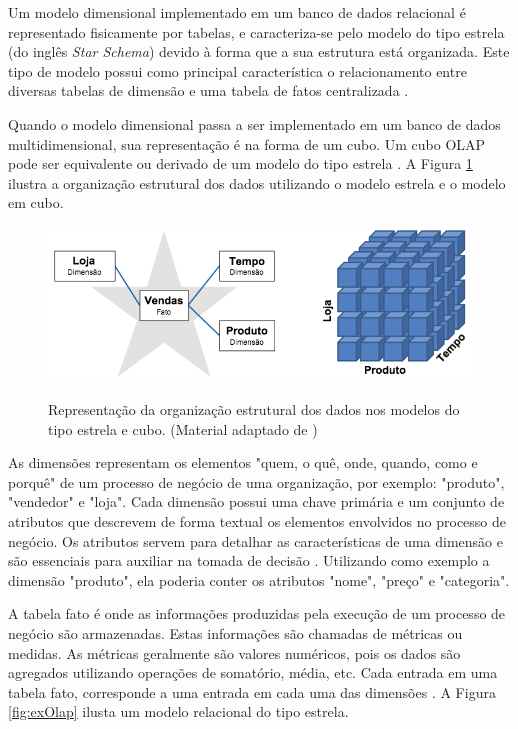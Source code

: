 Um modelo dimensional implementado em um banco de dados relacional é representado fisicamente por tabelas, e caracteriza-se pelo modelo do tipo estrela (do inglês \emph{Star Schema}) devido à forma que a sua estrutura está organizada. Este tipo de modelo possui como principal característica o relacionamento entre diversas tabelas de dimensão e uma tabela de fatos centralizada \cite{KIM13}.

Quando o modelo dimensional passa a ser implementado em um banco de dados multidimensional, sua representação é na forma de um cubo. Um cubo OLAP pode ser equivalente ou derivado de um modelo do tipo estrela \cite{KIM13}. A Figura \ref{fig:starVSolap} ilustra a organização estrutural dos dados utilizando o modelo estrela e o modelo em cubo.

\begin{figure}[h]
	\center
	\includegraphics[width=14cm]{images/starvsolap.png}
	\label{fig:starVSolap}
	\caption{Representação da organização estrutural dos dados nos modelos do tipo estrela e cubo. (Material adaptado de \cite{KIM13})}
\end{figure}

As dimensões representam os elementos "quem, o quê, onde, quando, como e porquê" de um processo de negócio de uma organização, por exemplo: "produto", "vendedor" e "loja". Cada dimensão possui uma chave primária e um conjunto de atributos que descrevem de forma textual os elementos envolvidos no processo de negócio. Os atributos servem para detalhar as características de uma dimensão e são essenciais para auxiliar na tomada de decisão \cite{KIM13}. Utilizando como exemplo a dimensão "produto", ela poderia conter os atributos "nome", "preço" e "categoria".

A tabela fato é onde as informações produzidas pela execução de um processo de negócio são armazenadas. Estas informações são chamadas de métricas ou medidas. As métricas geralmente são valores numéricos, pois os dados são agregados utilizando operações de somatório, média, etc. Cada entrada em uma tabela fato, corresponde a uma entrada em cada uma das dimensões \cite{KIM13}. A Figura \ref{fig:exOlap} ilusta um modelo relacional do tipo estrela.

